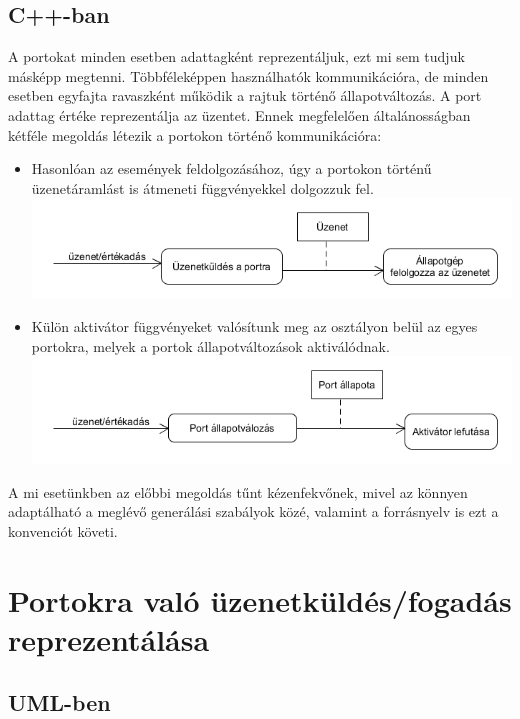 \documentclass[a4paper,12pt]{report}
\begin{document}
\subsection{C++-ban}
A portokat minden esetben adattagként reprezentáljuk, ezt mi sem tudjuk másképp megtenni. Többféleképpen használhatók kommunikációra, de minden esetben egyfajta ravaszként működik a rajtuk történő állapotváltozás. A port adattag értéke reprezentálja az üzentet. Ennek megfelelően általánosságban kétféle megoldás létezik a portokon történő kommunikációra:
\begin{itemize}
\item Hasonlóan az események feldolgozásához, úgy a portokon történű üzenetáramlást is átmeneti függvényekkel dolgozzuk fel.
\includegraphics[scale=0.6]{port_actfun.png}
\item Külön aktivátor függvényeket valósítunk meg az osztályon belül az egyes portokra, melyek a portok állapotváltozások aktiválódnak. 
\includegraphics[scale=0.6]{port_sendm.png} \\
\end{itemize}

A mi esetünkben az előbbi megoldás tűnt kézenfekvőnek, mivel az könnyen adaptálható a meglévő generálási szabályok közé, valamint a forrásnyelv is ezt a konvenciót követi. 

\section{Portokra való üzenetküldés/fogadás reprezentálása} \label{message}
\subsection{UML-ben}
\end{document}

